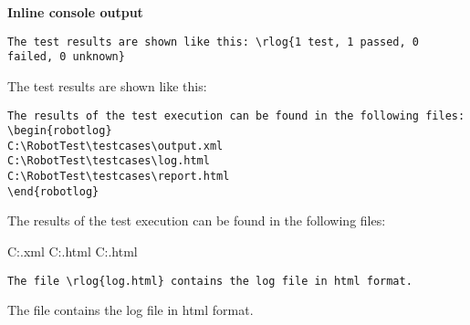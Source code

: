 \documentclass[a4paper,10pt]{report}
\begin{document}
\vspace{2ex}

\textbf{Inline console output}
\begin{verbatim}
The test results are shown like this: \rlog{1 test, 1 passed, 0 failed, 0 unknown}
\end{verbatim}

The test results are shown like this: 

\vspace{2ex}

\begin{verbatim}
The results of the test execution can be found in the following files:
\begin{robotlog}
C:\RobotTest\testcases\output.xml
C:\RobotTest\testcases\log.html
C:\RobotTest\testcases\report.html
\end{robotlog}
\end{verbatim}

The results of the test execution can be found in the following files:
\begin{robotlog}
C:\RobotTest\testcases\output.xml
C:\RobotTest\testcases\log.html
C:\RobotTest\testcases\report.html
\end{robotlog}

\vspace{2ex}

\begin{verbatim}
The file \rlog{log.html} contains the log file in html format.
\end{verbatim}

The file  contains the log file in html format.

\end{document}
